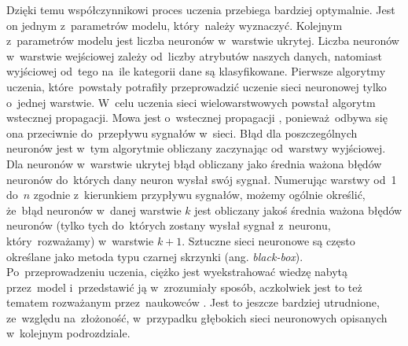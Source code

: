 Dzięki temu współczynnikowi proces uczenia przebiega bardziej optymalnie. Jest on jednym z~parametrów modelu, który~należy wyznaczyć. Kolejnym z~parametrów modelu jest liczba neuronów w~warstwie ukrytej. Liczba neuronów w~warstwie wejściowej zależy od~liczby atrybutów naszych danych, natomiast wyjściowej od~tego na~ile kategorii dane są klasyfikowane. Pierwsze algorytmy uczenia, które~powstały potrafiły przeprowadzić uczenie sieci neuronowej tylko o~jednej warstwie. W~celu uczenia sieci wielowarstwowych powstał algorytm wstecznej propagacji. Mowa jest o~wstecznej propagacji , ponieważ~odbywa się ona przeciwnie do~przepływu sygnałów w~sieci. Błąd dla poszczególnych neuronów jest w~tym algorytmie obliczany zaczynając od~warstwy wyjściowej. Dla neuronów w~warstwie ukrytej błąd obliczany jako średnia ważona błędów neuronów do~których dany neuron wysłał swój sygnał. Numerując warstwy od~1 do~$n$ zgodnie z~kierunkiem przypływu sygnałów, możemy ogólnie określić, że~błąd neuronów w~danej warstwie $k$ jest obliczany jakoś średnia ważona błędów neuronów (tylko tych do~których zostany wysłał sygnał z~neuronu, który~rozważamy) w~warstwie $k+1$. Sztuczne sieci neuronowe są często określane jako metoda typu czarnej skrzynki (ang. \textit{black-box}). Po~przeprowadzeniu uczenia, ciężko jest wyekstrahować wiedzę nabytą przez~model i~przedstawić ją w~zrozumiały sposób, aczkolwiek jest to też tematem rozważanym przez~naukowców \cite{blacboxann}. Jest to jeszcze bardziej utrudnione, ze~względu na~złożoność, w~przypadku głębokich sieci neuronowych opisanych w~kolejnym podrozdziale.

